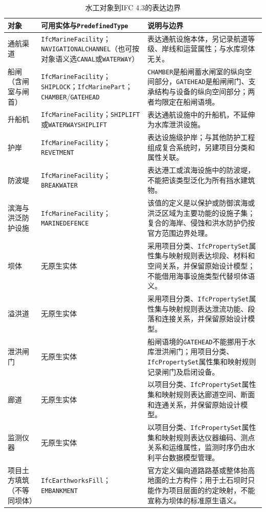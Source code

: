 \begin{table}[htbp]
\centering
\caption{水工对象到IFC 4.3的表达边界}
\label{tab:ifc-waterworks-mapping}
\small
\begin{tabular}{p{2.6cm}p{4.5cm}p{6.5cm}}
\toprule
对象 & 可用实体与\texttt{PredefinedType} & 说明与边界 \\
\midrule
通航渠道 & \texttt{IfcMarineFacility}；\texttt{NAVIGATIONALCHANNEL}（也可按对象语义选\texttt{CANAL}或\texttt{WATERWAY}） & 表达通航设施本体，另记录航道等级、岸线和运营属性；与水库坝体无关。 \\
船闸（含闸室与闸首） & \texttt{IfcMarineFacility}；\texttt{SHIPLOCK}；\texttt{IfcMarinePart}；\texttt{CHAMBER}/\texttt{GATEHEAD} & \texttt{CHAMBER}是船闸蓄水闸室的纵向空间部分，\texttt{GATEHEAD}是船闸闸门、支承结构与设备的纵向空间部分；两者均限定在船闸语境。 \\
升船机 & \texttt{IfcMarineFacility}；\texttt{SHIPLIFT}或\texttt{WATERWAYSHIPLIFT} & 表达通航设施中的升船机，不延伸为水库泄洪设施。 \\
护岸 & \texttt{IfcMarineFacility}；\texttt{REVETMENT} & 表达设施级护岸；与其他防护工程组成复合系统时，另建项目分类和属性关联。 \\
防波堤 & \texttt{IfcMarineFacility}；\texttt{BREAKWATER} & 表达港工或滨海设施中的防波堤，不能把该类型泛化为所有挡水建筑物。 \\
滨海与洪泛防护设施 & \texttt{IfcMarineFacility}；\texttt{MARINEDEFENCE} & 该值的定义是以保护或防御滨海或洪泛区域为主要功能的设施子集；复合的海岸、侵蚀和洪水防护仍按官方范围边界处理。 \\
坝体 & 无原生实体 & 采用项目分类、\texttt{IfcPropertySet}属性集与映射规则表达坝段、材料和空间关系，并保留原始设计模型；不能借用海事设施类型代替坝体语义。 \\
溢洪道 & 无原生实体 & 采用项目分类、\texttt{IfcPropertySet}属性集与映射规则表达泄流功能、段落和连接关系，并保留原始设计模型。 \\
泄洪闸门 & 无原生实体 & 船闸语境的\texttt{GATEHEAD}不能挪用于水库泄洪闸门；用项目分类、\texttt{IfcPropertySet}属性集和映射规则记录闸门及启闭设备。 \\
廊道 & 无原生实体 & 以项目分类、\texttt{IfcPropertySet}属性集和映射规则表达廊道空间、断面和连通关系，并保留原始设计模型。 \\
监测仪器 & 无原生实体 & 以项目分类、\texttt{IfcPropertySet}属性集和映射规则表达仪器编码、测点关系和运维属性，监测时序仍由水利平台数据模型管理。 \\
项目土方填筑（不等同坝体） & \texttt{IfcEarthworksFill}；\texttt{EMBANKMENT} & 官方定义偏向道路路基或整体抬高地面的土方构件；用于土石坝时只能作为项目层面的约定映射，不能宣称为坝体的标准原生语义。 \\
\bottomrule
\end{tabular}
\end{table}

